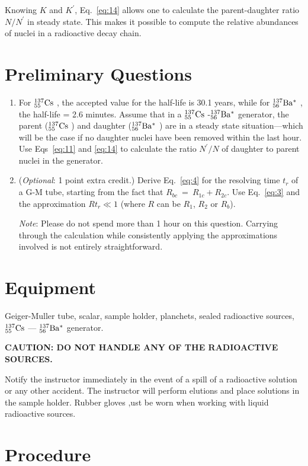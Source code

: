 \documentclass{article}
\newcommand{\cs}{${}^{137}_{55}{\rm Cs}$ }
\newcommand{\bam}{${}^{137}_{56}{\rm Ba^* }$ }
\begin{document}
Knowing $K$ and $K^\prime$, Eq.~\ref{eq:14} allows one to calculate the
parent-daughter ratio $N/N^\prime$ in steady state.  This
makes it possible to compute the relative abundances of nuclei in a
radioactive decay chain.

\section{Preliminary Questions}

\begin{enumerate}
\item For \cs, the accepted value for the half-life is 30.1 years,
while for \bam, the half-life = 2.6 minutes.  Assume that in a \cs-\bam generator,
the parent (\cs) and daughter (\bam) are in a steady state
situation---which will be the case if no daughter nuclei have been
removed within the last hour. Use Eqs~\ref{eq:11} and \ref{eq:14} to calculate the
ratio $N^\prime/N$ of daughter to parent nuclei in the
generator.

\item ({\em Optional}: 1 point extra credit.) Derive Eq.~\ref{eq:4} for the
resolving time $t_r$ of a G-M tube, starting from the fact
that $R_{bc } ~=~  R_{1c } + R_{2c }$.  Use Eq.~\ref{eq:3} and the approximation
$Rt_{r} \ll 1$ (where $R$ can be $R_{1}$, $R_{2}$ or $R_{b}$).

{\em Note}: Please do not spend more than 1 hour on this question.  Carrying
through the calculation while consistently applying the approximations
involved is not entirely straightforward.
\end{enumerate}

\section{Equipment}
Geiger-Muller tube, scalar, sample holder, planchets,
sealed radioactive sources, \cs --- \bam generator.

\bigskip

{\bf CAUTION: DO NOT HANDLE ANY OF THE RADIOACTIVE SOURCES.}

Notify the instructor immediately in the event of a spill of a radioactive
solution or any other accident.  The instructor will perform elutions
and place solutions in the sample holder.  Rubber gloves ,ust be worn
when working with liquid radioactive sources.


\section{Procedure}
\end{document}
